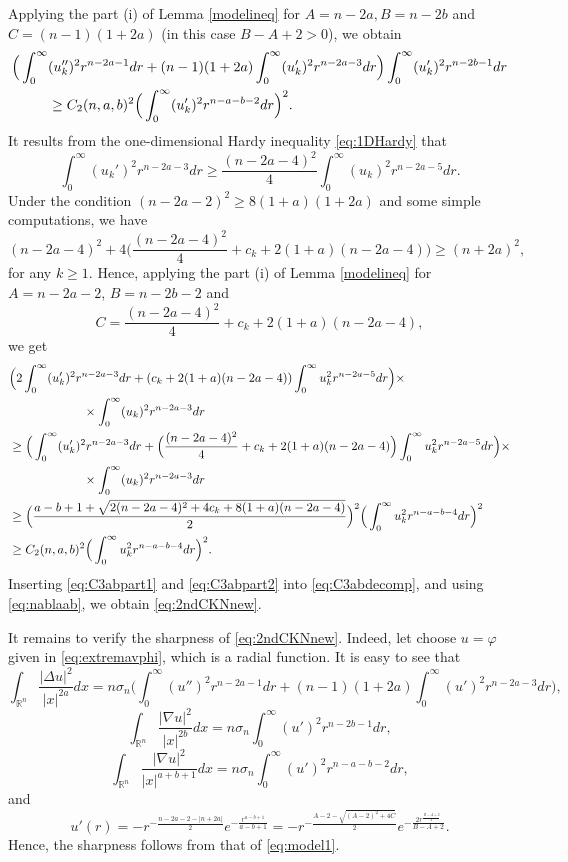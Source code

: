 \documentclass[a4paper,12pt]{article}
\theoremstyle{plain}
\theoremstyle{definition}
\theoremstyle{remark}
\def\R{\mathbb R}%
\def\na{\nabla}%
\def\irn{\int_{\R^n}}
\numberwithin{equation}{section}
\begin{document}
Applying the part (i) of Lemma \ref{modelineq} for $A = n-2a, B = n-2b$ and $C = (n-1)(1+2a)$ (in this case $B-A+ 2 >0$), we obtain 
\begin{align}\label{eq:C3abpart1}
\Big(\int_0^\infty& (u_k'')^2r^{n-2a -1} dr+ (n-1)(1+2a) \int_0^\infty (u_k')^2 r^{n-2a -3} dr\Big) \int_0^\infty (u_k')^2 r^{n-2b -1} dr\notag\\
&\geq C_2(n,a,b)^2 \Big(\int_0^\infty (u_k')^2 r^{n - a -b -2} dr\Big)^2.
\end{align}
It results from  the one-dimensional Hardy inequality \eqref{eq:1DHardy} that 
\[
\int_0^\infty (u_k')^2 r^{n-2a -3} dr \geq \frac{(n-2a -4)^2}4 \int_0^\infty (u_k)^2 r^{n-2a -5} dr.
\]
Under the  condition $(n-2a-2)^2 \geq 8(1+a)(1+2a)$ and some simple computations, we have
\[
(n-2a -4)^2 + 4\Big(\frac{(n-2a-4)^2}4 + c_k + 2 (1+a)(n-2a-4)\Big) \geq (n+ 2a)^2,
\]
for any $k\geq 1$. Hence, applying the part (i) of Lemma \ref{modelineq} for $A = n-2a-2$, $B = n-2b -2$ and
\[
C = \frac{(n-2a-4)^2}4 + c_k + 2 (1+a)(n-2a-4),
\]
we get 
\begin{align}\label{eq:C3abpart2}
&\Big(2\int_0^\infty (u_k')^2 r^{n-2a -3} dr + (c_k + 2(1+a)(n-2a -4))\int_0^\infty u_k^2 r^{n -2a -5} dr\Big) \times \notag\\
&\qquad\qquad\qquad \times \int_0^\infty (u_k)^2 r^{n-2a -3} dr\notag\\
&\geq \Big(\int_0^\infty (u_k')^2 r^{n-2a -3} dr + \Big( \frac{(n-2a -4)^2}4 + c_k + 2(1+a)(n-2a -4)\Big)\int_0^\infty u_k^2 r^{n -2a -5} dr\Big) \times \notag\\
&\qquad\qquad\qquad \times \int_0^\infty (u_k)^2 r^{n-2a -3} dr\notag\\
&\geq \Big(\frac{a -b + 1 + \sqrt{2(n-2a -4)^2 + 4c_k + 8(1+a)(n-2a -4)}}2\Big)^2 \Big(\int_0^\infty u_k^2 r^{n -a -b-4} dr\Big)^2\notag\\
&\geq C_2(n,a,b)^2\Big(\int_0^\infty u_k^2 r^{n -a -b-4} dr\Big)^2.
\end{align}
Inserting \eqref{eq:C3abpart1} and \eqref{eq:C3abpart2} into \eqref{eq:C3abdecomp}, and using \eqref{eq:nablaab}, we obtain \eqref{eq:2ndCKNnew}.

It remains to verify the sharpness of \eqref{eq:2ndCKNnew}. Indeed, let choose $u = \varphi$ given in \eqref{eq:extremavphi}, which is a radial function. It is easy to see that
\[
\irn \frac{|\Delta u|^2}{|x|^{2a}} dx = n\sigma_n \Big(\int_0^\infty (u'')^2 r^{n -2a -1} dr + (n-1)(1+2a)\int_0^\infty (u')^2 r^{n -2a -3} dr\Big),
\]
\[
\irn \frac{|\na u|^2}{|x|^{2b}} dx = n \sigma_n \int_0^\infty (u')^2 r^{n -2b -1} dr,
\]
\[
\irn \frac{|\na u|^2}{|x|^{a+b+1}} dx = n \sigma_n \int_0^\infty (u')^2 r^{n -a-b -2} dr,
\]
and
\[
u'(r) = -r^{-\frac{n-2a -2 - |n+2a|}2} e^{ -\frac{r^{a-b+1}}{a-b+1}} = -r^{-\frac{A-2 -\sqrt{(A-2)^2 + 4C}}2} e^{-\frac{2 r^{\frac{B-A+2}2}}{B-A+2}}.
\]
Hence, the sharpness follows from that  of \eqref{eq:model1}.
\end{document}
